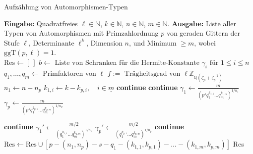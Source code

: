 \documentclass[12pt,a4paper,halfparskip,headsepline,bibtotocnumbered]{scrreprt}
\theoremstyle{nummermitklammern}
\theoremstyle{nonumberbreak}
\newcommand{\N}{\mathbb{N}}
\newcommand{\Z}{\mathbb{Z}}
\newcommand{\Q}{\mathbb{Q}}
\begin{document}
\begin{algorithm}[H]
	\caption{Aufzählung von Automorphismen-Typen}\label{alg:autotypes}
	\begin{algorithmic}[1]
		\State \textbf{Eingabe:} Quadratfreies $\ell \in \N$, $k \in \N$, $n \in \N$, $m \in \N$.
		\State \textbf{Ausgabe:} Liste aller Typen von Automorphismen mit Primzahlordnung $p$ von geraden Gittern der Stufe $\ell$, Determinante $\ell^k$, Dimension $n$, und Minimum $\geq m$, wobei $\text{ggT}(p, \ell) = 1$.
		\\
		\State $\text{Res} \gets \left[ \ \right]$
		\State $b \gets \text{ Liste von Schranken für die Hermite-Konstante } \gamma_i \text{ für } 1 \leq i \leq n$
		\State $q_1, \dots, q_m \gets$ Primfaktoren von $\ell$
			\State $f := \text{ Trägheitsgrad von } \ell \Z_{\Q(\zeta_p + \zeta_p^{-1})}$
				\State $n_1 \gets n - n_p$
					\State $k_{1,i} \gets k - k_{p,i}, \quad i \in \underline{m}$
						\State \textbf{continue}
					\EndIf
						 \textbf{continue} \EndIf
						\State $\gamma_1 \gets \frac{m}{\left(p^s q_1^{k_{1,1}} \dots q_m^{k_{1,m}}\right)^{1/n_1}}$
						\State $\gamma_p \gets \frac{m}{\left(p^s q_1^{k_{p,1}} \dots q_m^{k_{p,m}}\right)^{1/n_p}}$
						
						 \textbf{continue} \EndIf
							\State $\gamma_1' \gets \frac{m/2}{\left(q_1^{k_{1,1}} \dots q_m^{k_{1,m}}\right)^{1/n_1}}$
							\State $\gamma_p' \gets \frac{m/2}{\left(q_1^{k_{p,1}} \dots q_m^{k_{p,m}}\right)^{1/n_p}}$
							 \textbf{continue} \EndIf
						\EndIf
						\State $\text{Res} \gets \text{Res} \cup \left[ p - (n_1, n_p) - s - q_1 - (k_{1,1}, k_{p,1}) - \dots - (k_{1,m}, k_{p,m}) \right]$
					\EndFor
				\EndFor 
			\EndFor
		\EndFor
		\State \Return Res
	\end{algorithmic}
\end{algorithm}
\end{document}
